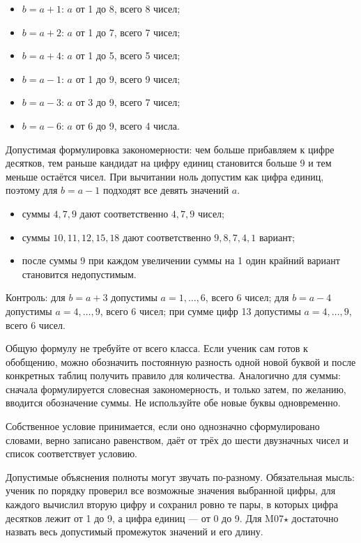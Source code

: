 \begin{teacherbox}
  \begin{itemize}
    \item \(b=a+1\): \(a\) от 1 до 8, всего 8 чисел;
    \item \(b=a+2\): \(a\) от 1 до 7, всего 7 чисел;
    \item \(b=a+4\): \(a\) от 1 до 5, всего 5 чисел;
    \item \(b=a-1\): \(a\) от 1 до 9, всего 9 чисел;
    \item \(b=a-3\): \(a\) от 3 до 9, всего 7 чисел;
    \item \(b=a-6\): \(a\) от 6 до 9, всего 4 числа.
  \end{itemize}
  Допустимая формулировка закономерности: чем больше прибавляем к цифре
  десятков, тем раньше кандидат на цифру единиц становится больше 9 и тем
  меньше остаётся чисел. При вычитании ноль допустим как цифра единиц, поэтому
  для \(b=a-1\) подходят все девять значений \(a\).
\end{teacherbox}

\begin{teacherbox}
  \begin{itemize}
    \item суммы \(4,7,9\) дают соответственно \(4,7,9\) чисел;
    \item суммы \(10,11,12,15,18\) дают соответственно \(9,8,7,4,1\)
      вариант;
    \item после суммы 9 при каждом увеличении суммы на 1 один крайний вариант
      становится недопустимым.
  \end{itemize}

  Контроль: для \(b=a+3\) допустимы \(a=1,\ldots,6\), всего 6 чисел; для
  \(b=a-4\) допустимы \(a=4,\ldots,9\), всего 6 чисел; при сумме цифр 13
  допустимы \(a=4,\ldots,9\), всего 6 чисел.
\end{teacherbox}

\newpage
\begin{teacherbox}
  Общую формулу не требуйте от всего класса. Если ученик сам готов к
  обобщению, можно обозначить постоянную разность одной новой буквой и после
  конкретных таблиц получить правило для количества. Аналогично для суммы:
  сначала формулируется словесная закономерность, и только затем, по желанию,
  вводится обозначение суммы. Не используйте обе новые буквы одновременно.
\end{teacherbox}

\begin{teacherbox}
  Собственное условие принимается, если оно однозначно сформулировано словами,
  верно записано равенством, даёт от трёх до шести двузначных чисел и список
  соответствует условию.

  Допустимые объяснения полноты могут звучать по-разному. Обязательная мысль:
  ученик по порядку проверил все возможные значения выбранной цифры, для
  каждого вычислил вторую цифру и сохранил ровно те пары, в которых цифра
  десятков лежит от 1 до 9, а цифра единиц --- от 0 до 9. Для M07\(\star\)
  достаточно назвать весь допустимый промежуток значений и его длину.
\end{teacherbox}
